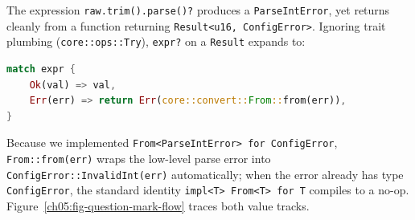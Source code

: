 The expression \texttt{raw.trim().parse()?} produces a \texttt{ParseIntError}, yet returns cleanly from a function returning \texttt{Result<u16, ConfigError>}. Ignoring trait plumbing (\texttt{core::ops::Try}), \texttt{expr?} on a \texttt{Result} expands to:

\begin{lstlisting}[language=Rust]
match expr {
    Ok(val) => val,
    Err(err) => return Err(core::convert::From::from(err)),
}
\end{lstlisting}

Because we implemented \texttt{From<ParseIntError> for ConfigError}, \texttt{From::from(err)} wraps the low-level parse error into \texttt{ConfigError::InvalidInt(err)} automatically; when the error already has type \texttt{ConfigError}, the standard identity \texttt{impl<T> From<T> for T} compiles to a no-op. Figure~\ref{ch05:fig-question-mark-flow} traces both value tracks.

